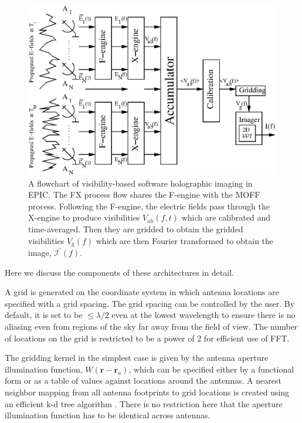 \documentclass[a4paper,fleqn,usenatbib]{mnras}
\begin{document}
\begin{figure}
  \includegraphics[width=\columnwidth]{figure2}
  \caption{A flowchart of visibility-based software holographic imaging in EPIC. The FX process flow shares the F-engine with the MOFF process. Following the F-engine, the electric fields pass through the X-engine to produce visibilities $V_\textrm{ab}(f,t)$ which are calibrated and time-averaged. Then they are gridded to obtain the gridded visibilities $V_\textrm{g}(f)$ which are then Fourier transformed to obtain the image, $\mathcal{I}^\prime(f)$.}
  \label{fig:FX-flowchart}
\end{figure}

Here we discuss the components of these architectures in detail. 

\par\medskip
{}
\par\medskip
\noindent A grid is generated on the coordinate system in which antenna 
locations are specified with a grid spacing. The grid spacing can be controlled 
by the user. By default, it is set to be $\le\lambda/2$ even at the 
lowest wavelength to ensure there is no aliasing even from regions of the sky 
far away from the field of view. The number of locations on the grid is 
restricted to be a power of 2 for efficient use of FFT. 

The gridding kernel in the simplest case is given by the antenna aperture
illumination function, $W(\mathbf{r}-\mathbf{r}_a)$, which can
be specified either by a functional form or as a table of values against 
locations around the antennas. A nearest neighbor mapping from all antenna 
footprints to grid locations is created using an efficient k-d tree algorithm 
\citep{man99}. There is no restriction here that the aperture illumination 
function has to be identical across antennas. 
\end{document}
